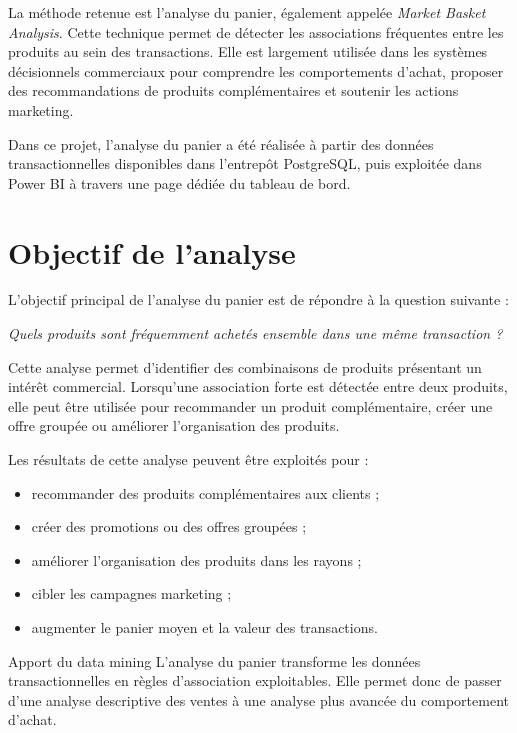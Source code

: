 \documentclass[12pt,a4paper,twoside]{report}
\begin{document}
La méthode retenue est l'analyse du panier, également appelée \textit{Market Basket Analysis}. Cette technique permet de détecter les associations fréquentes entre les produits au sein des transactions. Elle est largement utilisée dans les systèmes décisionnels commerciaux pour comprendre les comportements d'achat, proposer des recommandations de produits complémentaires et soutenir les actions marketing.

Dans ce projet, l'analyse du panier a été réalisée à partir des données transactionnelles disponibles dans l'entrepôt PostgreSQL, puis exploitée dans Power BI à travers une page dédiée du tableau de bord.

\section{Objectif de l'analyse}

L'objectif principal de l'analyse du panier est de répondre à la question suivante :

\begin{center}
\textit{Quels produits sont fréquemment achetés ensemble dans une même transaction ?}
\end{center}

Cette analyse permet d'identifier des combinaisons de produits présentant un intérêt commercial. Lorsqu'une association forte est détectée entre deux produits, elle peut être utilisée pour recommander un produit complémentaire, créer une offre groupée ou améliorer l'organisation des produits.

Les résultats de cette analyse peuvent être exploités pour :

\begin{itemize}
  \item recommander des produits complémentaires aux clients ;
  \item créer des promotions ou des offres groupées ;
  \item améliorer l'organisation des produits dans les rayons ;
  \item cibler les campagnes marketing ;
  \item augmenter le panier moyen et la valeur des transactions.
\end{itemize}

\begin{resultbox}{Apport du data mining}
L'analyse du panier transforme les données transactionnelles en règles d'association exploitables. Elle permet donc de passer d'une analyse descriptive des ventes à une analyse plus avancée du comportement d'achat.
\end{resultbox}
\end{document}
